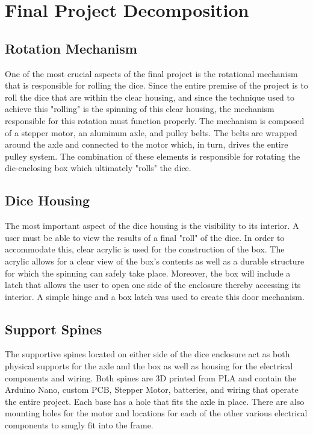 \documentclass[12pt]{article}
\begin{document}
\newpage
\section{Final Project Decomposition}

\subsection{Rotation Mechanism}
One of the most crucial aspects of the final project is the rotational mechanism that is responsible for rolling the dice. Since the entire premise of the project is to roll the dice that are within the clear housing, and since the technique used to achieve this "rolling" is the spinning of this clear housing, the mechanism responsible for this rotation must function properly. The mechanism is composed of a stepper motor, an aluminum axle, and pulley belts. The belts are wrapped around the axle and connected to the motor which, in turn, drives the entire pulley system. The combination of these elements is responsible for rotating the die-enclosing box which ultimately "rolls" the dice.

\subsection{Dice Housing}
The most important aspect of the dice housing is the visibility to its interior. A user must be able to view the results of a final "roll" of the dice. In order to accommodate this, clear acrylic is used for the construction of the box. The acrylic allows for a clear view of the box's contents as well as a durable structure for which the spinning can safely take place. Moreover, the box  will include a latch that allows the user to open one side of the enclosure thereby accessing its interior. A simple hinge and a box latch was used to create this door mechanism. 

\subsection{Support Spines}
The supportive spines located on either side of the dice enclosure act as both physical supports for the axle and the box as well as housing for the electrical components and wiring. Both spines are 3D printed from PLA and contain the Arduino Nano, custom PCB, Stepper Motor, batteries, and wiring that operate the entire project. Each base has a hole that fits the axle in place. There are also mounting holes for the motor and locations for each of the other various electrical components to snugly fit into the frame. 
\end{document}
